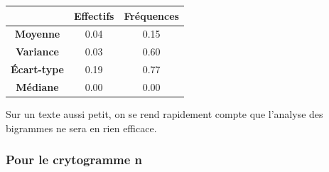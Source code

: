\documentclass[a4paper, titlepage]{livret}
\begin{document}
\begin{center}
\begin{tabular}{|c|c|c|}
	\hline
	& \textbf{Effectifs} & \textbf{Fréquences}\\
	\hline
	\textbf{Moyenne} &    0.04 &  0.15\\
	\hline
	\textbf{Variance} &    0.03 &  0.60\\
	\hline
	\textbf{Écart-type} &    0.19 &  0.77\\
	\hline
	\textbf{Médiane} &    0.00 &  0.00\\
	\hline
\end{tabular}
\label{tab32}
\end{center}

Sur un texte aussi petit, on se rend rapidement compte que l'analyse des bigrammes ne sera en rien efficace. 

\subsubsection{Pour le crytogramme n}
\end{document}
